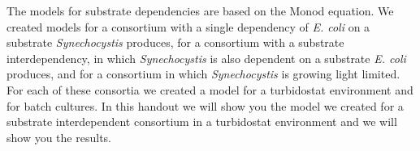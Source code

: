 \documentclass[10pt]{report}
\begin{document}



The models for substrate dependencies are based on the Monod equation. We created models for a consortium with a single dependency of \textit{E. coli} on a substrate \textit{Synechocystis} produces, for a consortium with a substrate interdependency, in which \textit{Synechocystis} is also dependent on a substrate \textit{E. coli} produces, and for a consortium in which \textit{Synechocystis} is growing light limited. For each of these consortia we created a model for a turbidostat environment and for batch cultures. In this handout we will show you the model we created for a substrate interdependent consortium in a turbidostat environment and we will show you the results.
\end{document}
